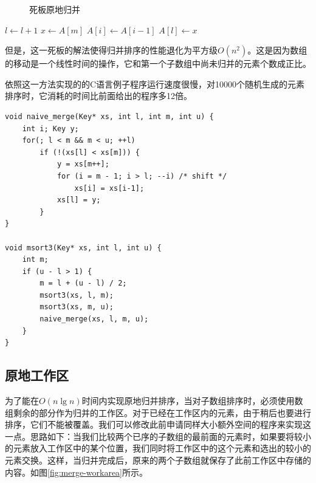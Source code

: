 \documentclass[b5paper]{ctexart}
\begin{document}
\begin{figure}[htbp]
 \centering
 \caption{死板原地归并}
 \label{fig:merge-in-place-naive}
\end{figure}

\begin{algorithmic}[1]
      \State $l \gets l + 1$
    \Else
      \State $x \gets A[m]$
       
        \State $A[i] \gets A[i-1]$
      \EndFor
      \State $A[l] \gets x$
    \EndIf
  \EndWhile
\EndProcedure
\end{algorithmic}

但是，这一死板的解法使得归并排序的性能退化为平方级$O(n^2)$。这是因为数组的移动是一个线性时间的操作，它和第一个子数组中尚未归并的元素个数成正比。

依照这一方法实现的的C语言例子程序运行速度很慢，对10000个随机生成的元素排序时，它消耗的时间比前面给出的程序多12倍。

\lstset{language=C}
\begin{lstlisting}
void naive_merge(Key* xs, int l, int m, int u) {
    int i; Key y;
    for(; l < m && m < u; ++l)
        if (!(xs[l] < xs[m])) {
            y = xs[m++];
            for (i = m - 1; i > l; --i) /* shift */
                xs[i] = xs[i-1];
            xs[l] = y;
        }
}

void msort3(Key* xs, int l, int u) {
    int m;
    if (u - l > 1) {
        m = l + (u - l) / 2;
        msort3(xs, l, m);
        msort3(xs, m, u);
        naive_merge(xs, l, m, u);
    }
}
\end{lstlisting}

\subsection{原地工作区}

为了能在$O(n \lg n)$时间内实现原地归并排序，当对子数组排序时，必须使用数组剩余的部分作为归并的工作区。对于已经在工作区内的元素，由于稍后也要进行排序，它们不能被覆盖。我们可以修改此前申请同样大小额外空间的程序来实现这一点。思路如下：当我们比较两个已序的子数组的最前面的元素时，如果要将较小的元素放入工作区中的某个位置，我们同时将工作区中的这个元素和选出的较小的元素交换。这样，当归并完成后，原来的两个子数组就保存了此前工作区中存储的内容。如图\ref{fig:merge-workarea}所示。
\end{document}
